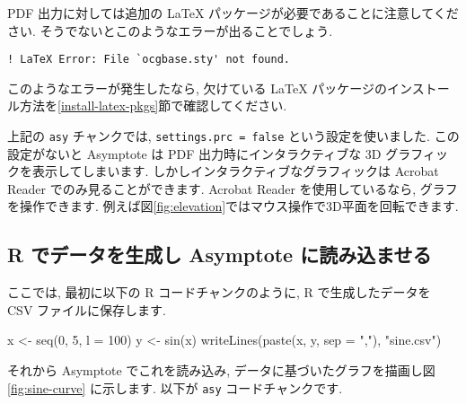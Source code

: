 \documentclass[
  11pt,
  lualatex,ja=standard,jafont=noto]{bxjsreport}
\newenvironment{Shaded}{\begin{snugshade}}{\end{snugshade}}
\newcommand{\AttributeTok}[1]{\textcolor[rgb]{0.77,0.63,0.00}{#1}}
\newcommand{\DecValTok}[1]{\textcolor[rgb]{0.00,0.00,0.81}{#1}}
\newcommand{\FunctionTok}[1]{\textcolor[rgb]{0.00,0.00,0.00}{#1}}
\newcommand{\NormalTok}[1]{#1}
\newcommand{\OtherTok}[1]{\textcolor[rgb]{0.56,0.35,0.01}{#1}}
\newcommand{\StringTok}[1]{\textcolor[rgb]{0.31,0.60,0.02}{#1}}
\begin{document}
PDF 出力に対しては追加の LaTeX パッケージが必要であることに注意してください. そうでないとこのようなエラーが出ることでしょう.

\begin{verbatim}
! LaTeX Error: File `ocgbase.sty' not found.
\end{verbatim}

このようなエラーが発生したなら, 欠けている LaTeX パッケージのインストール方法を\ref{install-latex-pkgs}節で確認してください.

上記の \texttt{asy} チャンクでは, \texttt{settings.prc = false} という設定を使いました. この設定がないと Asymptote は PDF 出力時にインタラクティブな 3D グラフィックを表示してしまいます. しかしインタラクティブなグラフィックは Acrobat Reader でのみ見ることができます. Acrobat Reader を使用しているなら, グラフを操作できます. 例えば図\ref{fig:elevation}ではマウス操作で3D平面を回転できます.

\hypertarget{r-ux3067ux30c7ux30fcux30bfux3092ux751fux6210ux3057-asymptote-ux306bux8aadux307fux8fbcux307eux305bux308b}{%
\subsection{R でデータを生成し Asymptote に読み込ませる}\label{r-ux3067ux30c7ux30fcux30bfux3092ux751fux6210ux3057-asymptote-ux306bux8aadux307fux8fbcux307eux305bux308b}}

ここでは, 最初に以下の R コードチャンクのように, R で生成したデータを CSV ファイルに保存します.

\begin{Shaded}
\begin{Highlighting}[numbers=left,,]
\NormalTok{x }\OtherTok{\textless{}{-}} \FunctionTok{seq}\NormalTok{(}\DecValTok{0}\NormalTok{, }\DecValTok{5}\NormalTok{, }\AttributeTok{l =} \DecValTok{100}\NormalTok{)}
\NormalTok{y }\OtherTok{\textless{}{-}} \FunctionTok{sin}\NormalTok{(x)}
\FunctionTok{writeLines}\NormalTok{(}\FunctionTok{paste}\NormalTok{(x, y, }\AttributeTok{sep =} \StringTok{","}\NormalTok{), }\StringTok{"sine.csv"}\NormalTok{)}
\end{Highlighting}
\end{Shaded}

それから Asymptote でこれを読み込み, データに基づいたグラフを描画し図\ref{fig:sine-curve} に示します. 以下が \texttt{asy} コードチャンクです.
\end{document}
